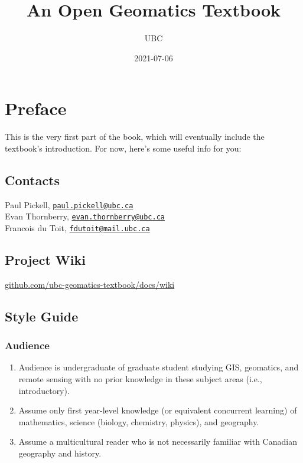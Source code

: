 \documentclass[
]{book}
\title{An Open Geomatics Textbook}
\author{UBC}
\date{2021-07-06}
\providecommand{\tightlist}{%
  \setlength{\itemsep}{0pt}\setlength{\parskip}{0pt}}
\begin{document}
\maketitle

{
\setcounter{tocdepth}{1}
\tableofcontents
}
\hypertarget{preface}{%
\chapter*{Preface}\label{preface}}

This is the very first part of the book, which will eventually include the textbook's introduction. For now, here's some useful info for you:

\hypertarget{contacts}{%
\section{Contacts}\label{contacts}}

Paul Pickell, \href{mailto:paul.pickell@ubc.ca}{\nolinkurl{paul.pickell@ubc.ca}}\\
Evan Thornberry, \href{mailto:evan.thornberry@ubc.ca}{\nolinkurl{evan.thornberry@ubc.ca}}\\
Francois du Toit, \href{mailto:fdutoit@mail.ubc.ca}{\nolinkurl{fdutoit@mail.ubc.ca}}

\hypertarget{project-wiki}{%
\section{Project Wiki}\label{project-wiki}}

\href{https://github.com/ubc-geomatics-textbook/docs/wiki}{github.com/ubc-geomatics-textbook/docs/wiki}

\hypertarget{style-guide}{%
\section{Style Guide}\label{style-guide}}

\hypertarget{audience}{%
\subsection{Audience}\label{audience}}

\begin{enumerate}
\def\labelenumi{\arabic{enumi}.}
\tightlist
\item
  Audience is undergraduate of graduate student studying GIS, geomatics, and remote sensing with no prior knowledge in these subject areas (i.e., introductory).
\item
  Assume only first year-level knowledge (or equivalent concurrent learning) of mathematics, science (biology, chemistry, physics), and geography.
\item
  Assume a multicultural reader who is not necessarily familiar with Canadian geography and history.
\end{enumerate}
\end{document}
